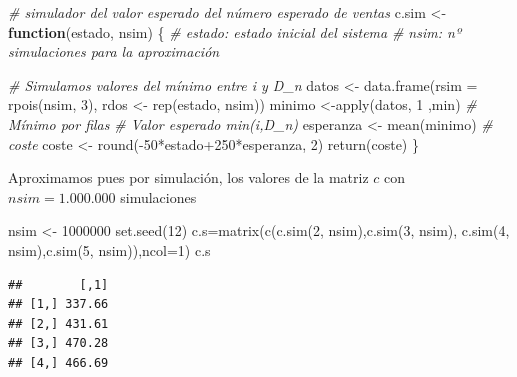 \documentclass[
]{book}
\newenvironment{Shaded}{\begin{snugshade}}{\end{snugshade}}
\newcommand{\AttributeTok}[1]{\textcolor[rgb]{0.77,0.63,0.00}{#1}}
\newcommand{\CommentTok}[1]{\textcolor[rgb]{0.56,0.35,0.01}{\textit{#1}}}
\newcommand{\ControlFlowTok}[1]{\textcolor[rgb]{0.13,0.29,0.53}{\textbf{#1}}}
\newcommand{\DecValTok}[1]{\textcolor[rgb]{0.00,0.00,0.81}{#1}}
\newcommand{\FunctionTok}[1]{\textcolor[rgb]{0.00,0.00,0.00}{#1}}
\newcommand{\NormalTok}[1]{#1}
\newcommand{\OtherTok}[1]{\textcolor[rgb]{0.56,0.35,0.01}{#1}}
\newcommand{\SpecialCharTok}[1]{\textcolor[rgb]{0.00,0.00,0.00}{#1}}
\theoremstyle{definition}
\theoremstyle{definition}
\theoremstyle{definition}
\theoremstyle{definition}
\theoremstyle{remark}
\begin{document}
\begin{Shaded}
\begin{Highlighting}[]
\CommentTok{\# simulador del valor esperado del número esperado de ventas}
\NormalTok{c.sim }\OtherTok{\textless{}{-}} \ControlFlowTok{function}\NormalTok{(estado, nsim)}
\NormalTok{\{}
  \CommentTok{\# estado: estado inicial del sistema}
  \CommentTok{\# nsim: nº simulaciones para la aproximación}
  
  \CommentTok{\# Simulamos valores del mínimo entre i y D\_n}
\NormalTok{  datos }\OtherTok{\textless{}{-}} \FunctionTok{data.frame}\NormalTok{(}\AttributeTok{rsim =} \FunctionTok{rpois}\NormalTok{(nsim, }\DecValTok{3}\NormalTok{), rdos }\OtherTok{\textless{}{-}} \FunctionTok{rep}\NormalTok{(estado, nsim))}
\NormalTok{  minimo }\OtherTok{\textless{}{-}}\FunctionTok{apply}\NormalTok{(datos, }\DecValTok{1}\NormalTok{ ,min) }\CommentTok{\# Mínimo por filas}
  \CommentTok{\# Valor esperado min(i,D\_n)}
\NormalTok{  esperanza }\OtherTok{\textless{}{-}} \FunctionTok{mean}\NormalTok{(minimo)}
  \CommentTok{\# coste}
\NormalTok{  coste }\OtherTok{\textless{}{-}} \FunctionTok{round}\NormalTok{(}\SpecialCharTok{{-}}\DecValTok{50}\SpecialCharTok{*}\NormalTok{estado}\SpecialCharTok{+}\DecValTok{250}\SpecialCharTok{*}\NormalTok{esperanza, }\DecValTok{2}\NormalTok{)}
  \FunctionTok{return}\NormalTok{(coste)}
\NormalTok{\}}
\end{Highlighting}
\end{Shaded}

Aproximamos pues por simulación, los valores de la matriz \(c\) con \(nsim=1.000.000\) simulaciones

\begin{Shaded}
\begin{Highlighting}[]
\NormalTok{nsim }\OtherTok{\textless{}{-}} \DecValTok{1000000}
\FunctionTok{set.seed}\NormalTok{(}\DecValTok{12}\NormalTok{)}
\NormalTok{c.s}\OtherTok{=}\FunctionTok{matrix}\NormalTok{(}\FunctionTok{c}\NormalTok{(}\FunctionTok{c.sim}\NormalTok{(}\DecValTok{2}\NormalTok{, nsim),}\FunctionTok{c.sim}\NormalTok{(}\DecValTok{3}\NormalTok{, nsim),}
      \FunctionTok{c.sim}\NormalTok{(}\DecValTok{4}\NormalTok{, nsim),}\FunctionTok{c.sim}\NormalTok{(}\DecValTok{5}\NormalTok{, nsim)),}\AttributeTok{ncol=}\DecValTok{1}\NormalTok{)}
\NormalTok{c.s}
\end{Highlighting}
\end{Shaded}

\begin{verbatim}
##        [,1]
## [1,] 337.66
## [2,] 431.61
## [3,] 470.28
## [4,] 466.69
\end{verbatim}
\end{document}
